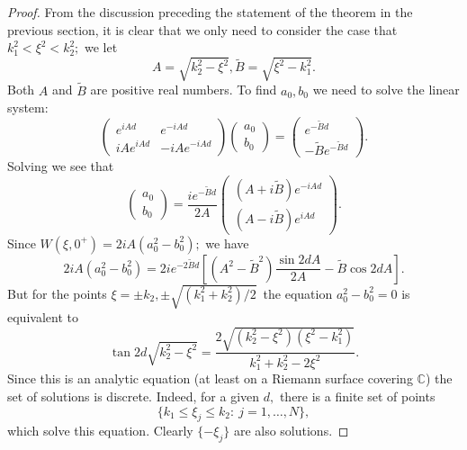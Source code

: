 \documentclass[11pt]{article}
\newcommand\tB{\widetilde B}
\newcommand\bbC{\mathbb C}
\theoremstyle{definition}
\theoremstyle{remark}
\begin{document}
\begin{proof}
From the discussion preceding the statement of the theorem in the
previous section, it is clear that we only need to consider the case
that $k_1^2<\xi^2<k_2^2;$ we let
\begin{equation}
     A=\sqrt{k_2^2-\xi^2},\tB=\sqrt{\xi^2-k^2_1}.
\end{equation}
Both $A$ and $\tB$ are positive real numbers.  To find $a_0,
b_0$ we need to solve the linear system:
\begin{equation}
  \left(\begin{matrix}
    e^{iAd}&e^{-iAd}\\iAe^{iAd}&-iAe^{-iAd}\end{matrix}\right)\left(\begin{matrix}
    a_0\\ b_0\end{matrix}\right)=
  \left(\begin{matrix} e^{-\tB d}\\-\tB e^{-\tB d}\end{matrix}\right).
\end{equation}
Solving we see that
\begin{equation}\label{eqn182.32}
  \left(\begin{matrix}
        a_0\\ b_0\end{matrix}\right)=\frac{ie^{-\tB d}}{2A}\left(\begin{matrix}
    (A+i\tB)e^{-iAd}\\ (A-i\tB)e^{iAd}\end{matrix}\right).
\end{equation}
Since $W(\xi,0^+)=2iA(a_0^2-b_0^2);$ we have
\begin{equation}\label{eqn184.31}
  2iA(a_0^2-b_0^2)=2ie^{-2\tB d}[(A^2-\tB^2)\frac{\sin 2dA}{2A}-\tB\cos 2dA].
\end{equation}
But for the points $\xi=\pm k_2,\pm\sqrt{(k_1^2+k_2^2)/2}\,$ the equation
$a_0^2-b_0^2=0$ is equivalent to
\begin{equation}\label{eqn22}
  \tan 2
  d\sqrt{k^2_2-\xi^2}=\frac{2\sqrt{(k^2_2-\xi^2)(\xi^2-k^2_1)}}
    {k^2_1+k^2_2-2\xi^2}.
\end{equation}
Since this is an analytic equation (at least on a Riemann surface covering
$\bbC$) the set of solutions is discrete. Indeed, for a given $d,$ there is a
finite set of points
$$\{k_1\leq \xi_j\leq k_2:\: j=1,\dots,N\},$$
which solve this equation. Clearly $\{-\xi_j\}$ are also solutions.


\end{proof}
\end{document}
